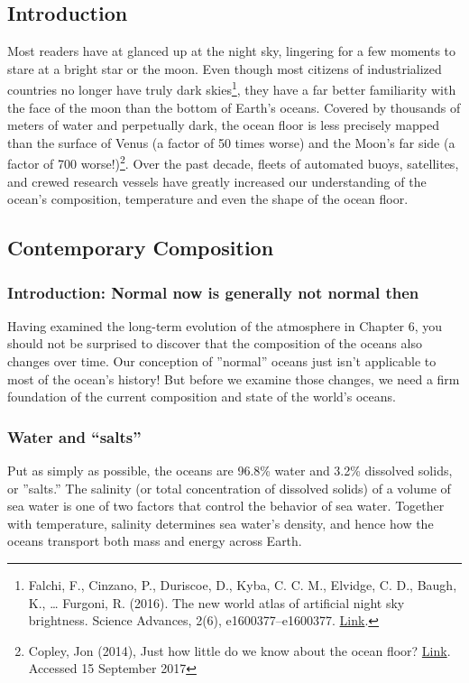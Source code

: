 \documentclass[amstex,12pt]{book}
\begin{document}
\subsection{Introduction}
Most readers have at glanced up at the night sky, lingering for a few moments to stare at a bright star or the moon. Even though most citizens of industrialized countries no longer have truly dark skies\footnote{Falchi, F., Cinzano, P., Duriscoe, D., Kyba, C. C. M., Elvidge, C. D., Baugh, K., … Furgoni, R. (2016). The new world atlas of artificial night sky brightness. Science Advances, 2(6), e1600377–e1600377. \href{https://doi.org/10.1126/sciadv.1600377}{Link}.}, they have a far better familiarity with the face of the moon than the bottom of Earth's oceans. Covered by thousands of meters of water and perpetually dark, the ocean floor is less precisely mapped than the surface of Venus (a factor of 50 times worse) and the Moon's far side (a factor of 700 worse!)\footnote{Copley, Jon (2014), Just how little do we know about the ocean floor? \href{https://theconversation.com/just-how-little-do-we-know-about-the-ocean-floor-32751}{Link}. Accessed 15 September 2017}. Over the past decade, fleets of automated buoys, satellites, and crewed research vessels have greatly increased our understanding of the ocean's composition, temperature and even the shape of the ocean floor. 
\subsection{Contemporary Composition}
\subsubsection{Introduction: Normal now is generally not normal then}
Having examined the long-term evolution of the atmosphere in Chapter 6, you should not be surprised to discover that the composition of the oceans also changes over time. Our conception of ''normal'' oceans just isn't applicable to most of the ocean's history! But before we examine those changes, we need a firm foundation of the current composition and state of the world's oceans.

\subsubsection{Water and ``salts''}
Put as simply as possible, the oceans are 96.8\% water and 3.2\% dissolved solids, or ''salts.'' The salinity (or total concentration of dissolved solids) of a volume of sea water is one of two factors that control the behavior of sea water. Together with temperature, salinity determines sea water's density, and hence how the oceans transport both mass and energy across Earth.    
\end{document}
